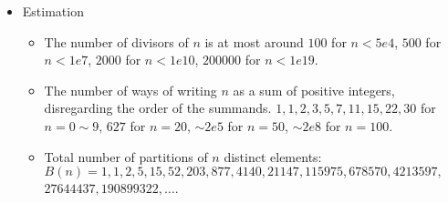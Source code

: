 \begin{itemize}
\item Estimation

\begin{itemize}
    \item The number of divisors of $n$ is at most around $100$ for $n<5e4$, $500$ for $n<1e7$, $2000$ for $n<1e10$, $200000$ for $n<1e19$.
    \item The number of ways of writing $n$ as a sum of positive integers, disregarding the order of the summands. $1, 1, 2, 3, 5, 7, 11, 15, 22, 30$ for $n=0\sim 9$, $627$ for $n=20$, $\sim 2e5$ for $n=50$, $\sim 2e8$ for $n=100$.
    \item Total number of partitions of $n$ distinct elements: $B(n)=1, 1, 2, 5, 15, 52, 203, 877, 4140, 21147, 115975, 678570, 4213597,$\\
    $27644437, 190899322, \ldots$.
\end{itemize}

\end{itemize}
